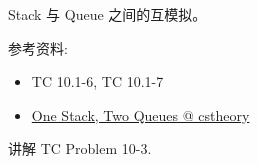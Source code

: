 \documentclass[a4paper, justified]{tufte-handout}
\begin{document}
\beginoptional

\begin{problem}[TC 10.1-7]
\end{problem}

\begin{solution}
\end{solution}

\beginot

\begin{ot}

  Stack 与 Queue 之间的互模拟。

  \noindent 参考资料:
  \begin{itemize}
    \item TC 10.1-6, TC 10.1-7
    \item \href{https://cstheory.stackexchange.com/questions/2562/one-stack-two-queues}{One Stack, Two Queues @ cstheory}
  \end{itemize}
\end{ot}

\begin{ot}
  讲解 TC Problem 10-3.
\end{ot}




\beginfb

% 
% 
\end{document}
